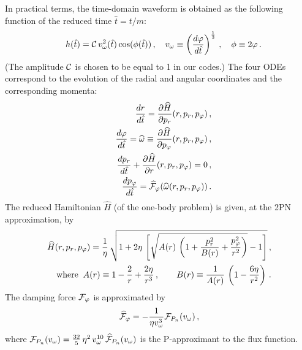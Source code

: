 In practical terms, the time-domain waveform
is obtained as the following function of the reduced time $\hat{t}=t/m$:
\begin{equation}
\label{4.1}
 \quad h(\hat{t}) = {\cal
C} \, v_{\omega}^2 (\hat{t}) \cos (\phi (\hat{t}))\,, \quad v_{\omega}
\equiv \left( \frac{d \varphi}{d \hat{t}} \right)^{\frac{1}{3}}\,, \quad \phi
\equiv 2\varphi \,.
\end{equation}
(The amplitude $\cal C$ is chosen to be equal to 1 in our codes.)
The four ODEs correspond to the evolution of the radial and angular
coordinates and the corresponding momenta:
\begin{eqnarray}
\label{eq:3.28}
&&\frac{dr}{d \hat{t}} = \frac{\partial \widehat{H}}{\partial p_r}
(r,p_r,p_\varphi)\,, \\
\label{3.29}
&& \frac{d \varphi}{d \hat{t}} = \widehat{\omega} \equiv \frac{\partial \widehat{H}}{\partial p_\varphi}
(r,p_r,p_\varphi)\,, \\
\label{3.30}
&& \frac{d p_r}{d \hat{t}} + \frac{\partial \widehat{H}}{\partial r}
(r,p_r,p_\varphi)=0\,, \\
&& \frac{d p_\varphi}{d \hat{t}} = \widehat{\cal F}_\varphi(\widehat{\omega} (r,p_r,p_{\varphi}))\,.
\label{3.31}
\end{eqnarray}
The reduced Hamiltonian $\widehat{H}$ (of the one-body problem)
is given, at the 2PN approximation, by
\label{eq:4.4}
\begin{eqnarray}
\label{eq:3.32}
\widehat{H}(r,p_r,p_\varphi) = \frac{1}{\eta}\,\sqrt{1 + 2\eta\,\left [
\sqrt{A(r)\,\left (1 + \frac{p_r^2}{B(r)} + \frac{p_\varphi^2}{r^2} \right )} -1 \right ]}\,,\\
\label{3.34}
{\rm where}\;\;
A(r) \equiv 1 - \frac{2}{r} + \frac{2\eta}{r^3} \,,
\quad \quad B(r) \equiv \frac{1}{A(r)}\,\left (1 - \frac{6\eta}{r^2}
\right )\,.
\end{eqnarray}
The damping force $\cal{F}_{\varphi}$ is approximated by
\begin{equation}
\widehat{{\cal F}}_{\varphi}
=-\frac{1}{\eta v_\omega ^3}{\cal F}_{P_n}(v_\omega)\,,
\label{eq:damp}
\end{equation}
where $
{\cal F}_{P_n} (v_{\omega})
= \frac{32}{5}\,\eta^2\,v_\omega^{10}\,
{\widehat{\cal F}}_{P_n} (v_{\omega})$
is the P-approximant to the flux function.

